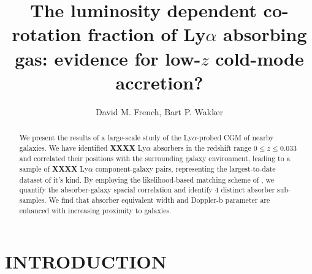 \documentclass[twocolumn,tighten]{aastex62}
\begin{document}
\title{The luminosity dependent co-rotation fraction of Ly$\alpha$ absorbing gas: evidence for low-$z$ cold-mode accretion?}


\author{David M. French, Bart P. Wakker}


\begin{abstract}
We present the results of a large-scale study of the Ly$\alpha$-probed CGM of nearby galaxies. We have identified \textbf{XXXX} Ly$\alpha$ absorbers in the redshift range $0 \leq z \leq 0.033$ and correlated their positions with the surrounding galaxy environment, leading to a sample of \textbf{XXXX} Ly$\alpha$ component-galaxy pairs, representing the largest-to-date dataset of it's kind. By employing the likelihood-based matching scheme of \cite{french2017}, we quantify the absorber-galaxy spacial correlation and identify 4 distinct absorber sub-samples. We find that absorber equivalent width and Doppler-b parameter are enhanced with increasing proximity to galaxies.

\end{abstract}




\section{INTRODUCTION}
\end{document}

